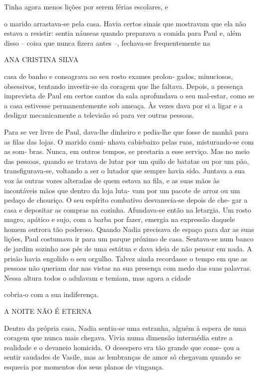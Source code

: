Tinha agora menos lições por serem férias escolares, e

o marido arrastava‑se pela casa. Havia certos sinais que mostravam que
ela não estava a resistir: sentia náuseas quando preparava a comida para
Paul e, além disso -- coisa que nunca fizera antes --, fechava‑se
frequentemente na

ANA CRISTINA SILVA

casa de banho e consagrava ao seu rosto exames prolon‑ gados,
minuciosos, obsessivos, tentando investir‑se da coragem que lhe faltava.
Depois, a presença imprevista de Paul em certos cantos da sala
aprofundava o seu mal‑estar, como se a casa estivesse permanentemente
sob ameaça. Às vezes dava por si a ligar e a desligar mecanicamente a
televisão só para ver outras pessoas.

Para se ver livre de Paul, dava‑lhe dinheiro e pedia‑lhe que fosse de
manhã para as filas das lojas. O marido cami‑ nhava cabisbaixo pelas
ruas, misturando‑se com as som‑ bras. Nunca, em outros tempos, se
prestaria a esse serviço. Mas no meio das pessoas, quando se tratava de
lutar por um quilo de batatas ou por um pão, transfigurava‑se, voltando
a ser o lutador que sempre havia sido. Juntava a sua voz às outras vozes
alteradas de quem estava na fila, e as suas mãos às incontáveis mãos que
dentro da loja luta‑ vam por um pacote de arroz ou um pedaço de
chouriço. O seu espírito combativo desvanecia‑se depois de che‑ gar a
casa e depositar as compras na cozinha. Afundava‑se então na letargia.
Um rosto magro, apático e sujo, com a barba por fazer, emergia na
expressão daquele homem outrora tão poderoso. Quando Nadia precisava de
espaço para dar as suas lições, Paul costumava ir para um parque próximo
de casa. Sentava‑se num banco de jardim sozinho aos pés de uma estátua e
dava ideia de não pensar em nada. A prisão havia engolido o seu orgulho.
Talvez ainda recordasse o tempo em que as pessoas não queriam dar nas
vistas na sua presença com medo das suas palavras. Nessa altura todos o
adulavam e temiam, mas agora a cidade

cobria‑o com a sua indiferença.

A NOITE NÃO É ETERNA

Dentro da própria casa, Nadia sentia‑se uma estranha, alguém à espera de
uma coragem que nunca mais chegava. Vivia numa dimensão intermédia entre
a realidade e o devaneio homicida. O desespero era tão grande que come‑
çou a sentir saudades de Vasile, mas as lembranças de amor só chegavam
quando se esquecia por momentos dos seus planos de vingança.

